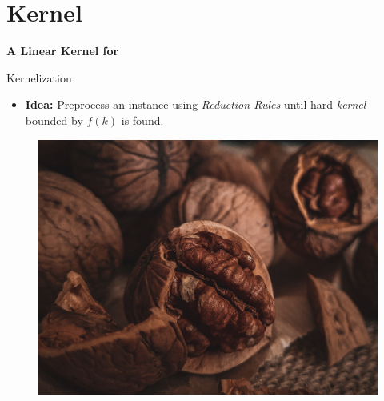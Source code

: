 \section{Kernel}

\begin{frame}[c]{}
    \begin{center}
        \textbf{A Linear Kernel for \psdom}

        \textit{}
    \end{center}
\end{frame}

\begin{frame}[c]{Kernelization}
\begin{itemize}
    \item \textbf{Idea: } Preprocess an instance using \textit{Reduction Rules} until hard \textit{kernel} bounded by $f(k)$ is found.
\end{itemize}

\begin{figure}
\centering
\resizebox{0.35\textwidth}{!} {
\includegraphics{fig/pexels-yulia-ilina-10400351.jpg}
}
\end{figure}
\end{frame}


